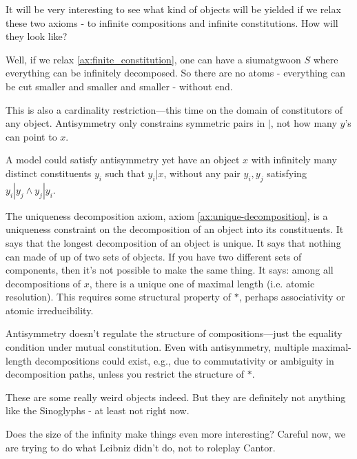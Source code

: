
It will be very interesting to see what kind of objects will be yielded if we relax these two axioms - to infinite compositions and infinite constitutions. How will they look like?

Well, if we relax \ref{ax:finite_constitution}, one can have a siumatgwoon $S$ where everything can be infinitely decomposed. So there are no atoms - everything can be cut smaller and smaller and smaller - without end.

This is also a cardinality restriction—this time on the domain of constitutors of any object. Antisymmetry only constrains symmetric pairs in $|$, not how many $y$'s can point to $x$.

A model could satisfy antisymmetry yet have an object $x$ with infinitely many distinct constituents $y_i$ such that $y_i|x$, without any pair $y_i, y_j$ satisfying $y_i|y_j \wedge y_j|y_i$.

The uniqueness decomposition axiom, axiom \ref{ax:unique-decomposition}, is a uniqueness constraint on the decomposition of an object into its constituents. It says that the longest decomposition of an object is unique. It says that nothing can made of up of two sets of objects. If you have two different sets of components, then it's not possible to make the same thing. It says: among all decompositions of $x$, there is a unique one of maximal length (i.e. atomic resolution). This requires some structural property of $*$, perhaps associativity or atomic irreducibility. 

Antisymmetry doesn't regulate the structure of compositions—just the equality condition under mutual constitution. Even with antisymmetry, multiple maximal-length decompositions could exist, e.g., due to commutativity or ambiguity in decomposition paths, unless you restrict the structure of $*$.



These are some really weird objects indeed. But they are definitely not anything like the Sinoglyphs - at least not right now. 




Does the size of the infinity make things even more interesting? Careful now, we are trying to do what Leibniz didn't do, not to roleplay Cantor. 

